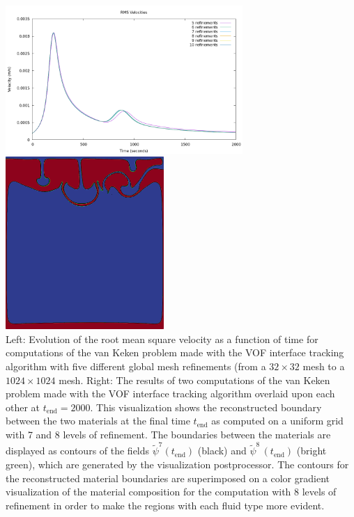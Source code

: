 \begin{itemize}
\begin{center}
\includegraphics[width=9cm]{images/benchmark_vaks97/aspect_vof/rms_vel_comparison.png}
\includegraphics[width=6cm]{images/benchmark_vaks97/aspect_vof/vof_van_keken_refinement_comparison.png}\\
{\captionfont 
Left:
Evolution of the root mean square velocity as a function of time for computations 
of the van Keken problem made with the VOF interface tracking algorithm with five 
different global mesh refinements (from a $32 \times 32$ mesh 
to a $1024 \times 1024$ mesh.
Right:
The results of two computations of the van Keken problem made with the VOF 
interface tracking algorithm overlaid upon each other at $t_\text{end}=2000$.
This visualization shows the reconstructed boundary between the two
materials at the final time $t_\text{end}$ as computed on a uniform grid
with 7 and 8 levels of refinement.
The boundaries between the materials are displayed as contours
of the fields $\tilde{\psi}^7(t_\text{end})$ (black) and
$\tilde{\psi}^8\,(t_\text{end})$ (bright green), which are generated by the  visualization postprocessor.
The contours for the reconstructed material boundaries are superimposed
on a color gradient visualization of the material composition for the
computation with 8 levels of refinement in order to make the regions
with each fluid type more evident.   }
\end{center}


\end{itemize}
